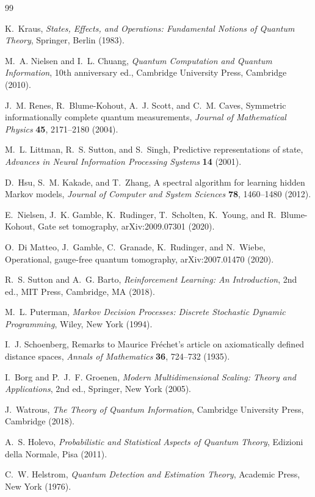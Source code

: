 \documentclass[11pt]{article}
\theoremstyle{definition}
\theoremstyle{remark}
\begin{document}
\begin{thebibliography}{99}

K.~Kraus,
\emph{States, Effects, and Operations: Fundamental Notions of Quantum
Theory}, Springer, Berlin (1983).

M.~A. Nielsen and I.~L. Chuang,
\emph{Quantum Computation and Quantum Information}, 10th anniversary ed.,
Cambridge University Press, Cambridge (2010).

J.~M. Renes, R.~Blume-Kohout, A.~J. Scott, and C.~M. Caves,
Symmetric informationally complete quantum measurements,
\emph{Journal of Mathematical Physics} \textbf{45}, 2171--2180 (2004).

M.~L. Littman, R.~S. Sutton, and S.~Singh,
Predictive representations of state,
\emph{Advances in Neural Information Processing Systems} \textbf{14} (2001).

D.~Hsu, S.~M. Kakade, and T.~Zhang,
A spectral algorithm for learning hidden Markov models,
\emph{Journal of Computer and System Sciences} \textbf{78}, 1460--1480
(2012).

E.~Nielsen, J.~K. Gamble, K.~Rudinger, T.~Scholten, K.~Young, and
R.~Blume-Kohout,
Gate set tomography,
arXiv:2009.07301 (2020).

O.~Di Matteo, J.~Gamble, C.~Granade, K.~Rudinger, and N.~Wiebe,
Operational, gauge-free quantum tomography,
arXiv:2007.01470 (2020).

R.~S. Sutton and A.~G. Barto,
\emph{Reinforcement Learning: An Introduction}, 2nd ed.,
MIT Press, Cambridge, MA (2018).

M.~L. Puterman,
\emph{Markov Decision Processes: Discrete Stochastic Dynamic Programming},
Wiley, New York (1994).

I.~J. Schoenberg,
Remarks to Maurice Fr\'echet's article on axiomatically defined distance
spaces,
\emph{Annals of Mathematics} \textbf{36}, 724--732 (1935).

I.~Borg and P.~J.~F. Groenen,
\emph{Modern Multidimensional Scaling: Theory and Applications}, 2nd ed.,
Springer, New York (2005).

J.~Watrous,
\emph{The Theory of Quantum Information},
Cambridge University Press, Cambridge (2018).

A.~S. Holevo,
\emph{Probabilistic and Statistical Aspects of Quantum Theory},
Edizioni della Normale, Pisa (2011).

C.~W. Helstrom,
\emph{Quantum Detection and Estimation Theory},
Academic Press, New York (1976).

\end{thebibliography}
\end{document}
